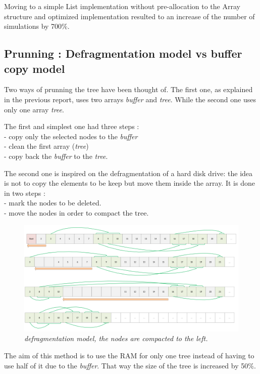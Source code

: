 Moving to a simple List implementation without pre-allocation to the Array structure and optimized implementation resulted to an increase of the number of simulations by 700\%.

\subsection{Prunning : Defragmentation model vs buffer copy model}

Two ways of prunning the tree have been thought of. The first one, as  explained in the previous report, uses two arrays \textit{buffer} and \textit{tree}. While the second one uses only one array \textit{tree}.

The first and simplest one had three steps : \\
- copy only the selected nodes to the \textit{buffer} \\
- clean the first array (\textit{tree}) \\
- copy back the \textit{buffer} to the \textit{tree}.

The second one is inspired on the defragmentation of a hard disk drive: the idea is not to copy the elements to be keep but move them inside the array. It is done in two steps : \\
- mark the nodes to be deleted. \\
- move the nodes in order to compact the tree. \\

\begin{figure}[H] 
\centerline{\includegraphics[width=\textwidth]{Optimisations/array.png}}
\caption{\label{fig:Defrag}\textit{defragmentation model, the nodes are compacted to the left.}}
\end{figure}

The aim of this method is to use the RAM for only one tree instead of having to use half of it due to the \textit{buffer}. That way the size of the tree is increased by 50\%.

